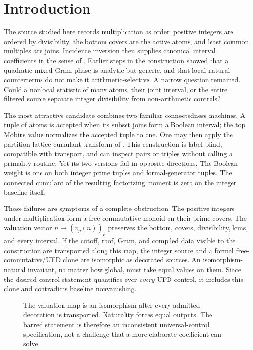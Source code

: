\section{Introduction}
\label{sec:introduction}

The source studied here records multiplication as order: positive integers
are ordered by divisibility, the bottom covers are the active atoms, and
least common multiples are joins.  Incidence inversion then supplies
canonical interval coefficients in the sense of \citet{Rota1964}.  Earlier
steps in the construction showed that a quadratic mixed Gram phase is
analytic but generic, and that local natural counterterms do not make it
arithmetic-selective.  A narrow question remained.  Could a nonlocal
statistic of many atoms, their joint interval, or the entire filtered source
separate integer divisibility from non-arithmetic controls?

The most attractive candidate combines two familiar connectedness
machines.  A tuple of atoms is accepted when its subset joins form a Boolean
interval; the top M{\"o}bius value normalizes the accepted tuple to one.  One
may then apply the partition-lattice cumulant transform of
\citet{Speed1983}.  This construction is label-blind, compatible with
transport, and can inspect pairs or triples without calling a primality
routine.  Yet its two versions fail in opposite directions.  The Boolean
weight is one on both integer prime tuples and formal-generator tuples.  The
connected cumulant of the resulting factorizing moment is zero on the
integer baseline itself.

Those failures are symptoms of a complete obstruction.  The positive
integers under multiplication form a free commutative monoid on their prime
covers.  The valuation vector
\(
  n\mapsto(v_p(n))_p
\)
preserves the bottom, covers, divisibility, lcms, and every interval.  If the
cutoff, roof, Gram, and compiled data visible to the construction are
transported along this map, the integer source and a formal
free-commutative/UFD clone are isomorphic as decorated sources.  An
isomorphism-natural invariant, no matter how global, must take equal values
on them.  Since the desired control statement quantifies over \emph{every}
UFD control, it includes this clone and contradicts baseline nonvanishing.

\begin{figure}[t]
\centering

\caption{The valuation map is an isomorphism after every admitted decoration
is transported.  Naturality forces equal outputs.  The barred statement is
therefore an inconsistent universal-control specification, not a challenge
that a more elaborate coefficient can solve.}
\label{fig:clone-obstruction}
\end{figure}

